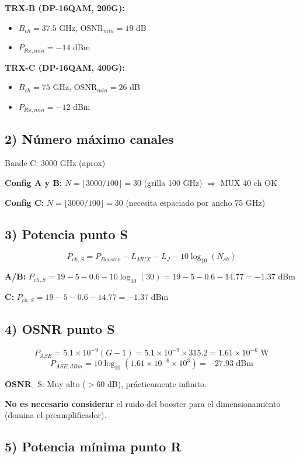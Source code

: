 \documentclass[a4paper,11pt]{article}
\begin{document}
\textbf{TRX-B (DP-16QAM, 200G):}
\begin{itemize}
    \item $B_{ch} = 37.5$ GHz, OSNR$_{min} = 19$ dB
    \item $P_{Rx,min} = -14$ dBm
\end{itemize}

\textbf{TRX-C (DP-16QAM, 400G):}
\begin{itemize}
    \item $B_{ch} = 75$ GHz, OSNR$_{min} = 26$ dB
    \item $P_{Rx,min} = -12$ dBm
\end{itemize}

\subsection*{2) Número máximo canales}

Bande C: 3000 GHz (aprox)

\textbf{Config A y B:} $N = \lfloor 3000/100 \rfloor = 30$ (grilla 100 GHz) $\Rightarrow$ MUX 40 ch OK

\textbf{Config C:} $N = \lfloor 3000/100 \rfloor = 30$ (necesita espaciado por ancho 75 GHz)

\subsection*{3) Potencia punto S}

$$P_{ch,S} = P_{Booster} - L_{MUX} - L_J - 10\log_{10}(N_{ch})$$

\textbf{A/B:} $P_{ch,S} = 19 - 5 - 0.6 - 10\log_{10}(30) = 19 - 5 - 0.6 - 14.77 = -1.37$ dBm

\textbf{C:} $P_{ch,S} = 19 - 5 - 0.6 - 14.77 = -1.37$ dBm

\subsection*{4) OSNR punto S}

$$P_{ASE} = 5.1 \times 10^{-9} (G - 1) = 5.1 \times 10^{-9} \times 315.2 = 1.61 \times 10^{-6} \text{ W}$$
$$P_{ASE,dBm} = 10\log_{10}(1.61 \times 10^{-6} \times 10^3) = -27.93 \text{ dBm}$$

\textbf{OSNR}_S: Muy alto ($>$60 dB), prácticamente infinito. 

\textbf{No es necesario considerar} el ruido del booster para el dimensionamiento (domina el preamplificador).

\subsection*{5) Potencia mínima punto R}
\end{document}
